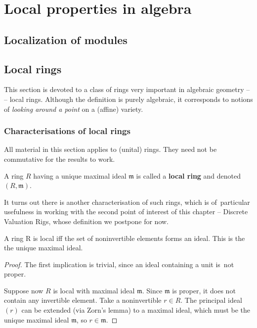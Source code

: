 \chapter{Local properties in algebra}

\section{Localization of modules}

\section{Local rings}

This section is devoted to a class of rings very important in algebraic geometry --
-- local rings. Although the definition is purely algebraic, it corresponds to
notions of \textit{looking around a point} on a (affine) variety.

\subsection{Characterisations of local rings}

All material in this section applies to (unital) rings. They need not be commutative
for the results to work.

\begin{def}
    A ring \( R \) having a unique maximal ideal \( \mathfrak{m} \) is called
    a {\bf local ring} and denoted \( (R, \mathfrak{m}) \).
\end{def}

It turns out there is another characterisation of such rings, which is of~particular
usefulness in working with the second point of interest of this chapter -- Discrete
Valuation Rigs, whose definition we postpone for now.

\begin{thm}
    A ring R is local iff the set of noninvertible elements forms an ideal.
    This is the the unique maximal ideal.
\end{thm}

\begin{proof}
    The first implication is trivial, since an ideal containing a unit
    is~not proper.

    Suppose now \( R \) is local with maximal ideal \( \mathfrak{m} \).
    Since \( \mathfrak{m} \) is proper, it does not contain any invertible
    element. Take a noninvertible \( r \in R \). The principal ideal \( (r) \)
    can be extended (via Zorn's lemma) to a maximal ideal, which must be
    the unique maximal ideal \( \mathfrak{m} \), so \( r \in \mathfrak{m} \).

\end{proof}

